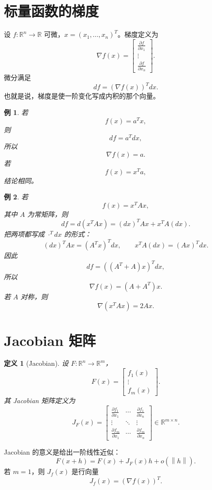 \documentclass[UTF8,openany,zihao=-4]{ctexbook}
\theoremstyle{cnplain}
\newtheorem{definition}{定义}[chapter]
\newtheorem{example}{例}[chapter]
\newcommand{\R}{\mathbb R}
\newcommand{\norm}[1]{\left\lVert #1\right\rVert}
\begin{document}
\section{标量函数的梯度}

设 $f:\R^n\to\R$ 可微，$x=(x_1,
\ldots,x_n)^T$。梯度定义为
\[
\nabla f(x)=
\begin{bmatrix}
\frac{\partial f}{\partial x_1}\\
\vdots\\
\frac{\partial f}{\partial x_n}
\end{bmatrix}.
\]
微分满足
\[
df=(\nabla f(x))^Tdx.
\]
也就是说，梯度是使一阶变化写成内积的那个向量。

\begin{example}
若
\[
f(x)=a^Tx,
\]
则
\[
df=a^Tdx,
\]
所以
\[
\nabla f(x)=a.
\]
若
\[
f(x)=x^Ta,
\]
结论相同。
\end{example}

\begin{example}
若
\[
f(x)=x^TAx,
\]
其中 $A$ 为常矩阵，则
\[
df=d(x^TAx)=(dx)^TAx+x^TA(dx).
\]
把两项都写成 $\cdot^Tdx$ 的形式：
\[
(dx)^TAx=(A^Tx)^Tdx,
\qquad
x^TA(dx)=(A x)^Tdx.
\]
因此
\[
df=((A^T+A)x)^Tdx,
\]
所以
\[
\nabla f(x)=(A+A^T)x.
\]
若 $A$ 对称，则
\[
\nabla(x^TAx)=2Ax.
\]
\end{example}

\section{Jacobian 矩阵}

\begin{definition}[Jacobian]
设 $F:\R^n\to\R^m$，
\[
F(x)=
\begin{bmatrix}
f_1(x)\\
\vdots\\
f_m(x)
\end{bmatrix}.
\]
其 Jacobian 矩阵定义为
\[
J_F(x)=
\begin{bmatrix}
\frac{\partial f_1}{\partial x_1}&\cdots&\frac{\partial f_1}{\partial x_n}\\
\vdots&\ddots&\vdots\\
\frac{\partial f_m}{\partial x_1}&\cdots&\frac{\partial f_m}{\partial x_n}
\end{bmatrix}
\in\R^{m\times n}.
\]
\end{definition}

Jacobian 的意义是给出一阶线性近似：
\[
F(x+h)=F(x)+J_F(x)h+o(\norm h).
\]
若 $m=1$，则 $J_f(x)$ 是行向量
\[
J_f(x)=(\nabla f(x))^T.
\]
\end{document}
